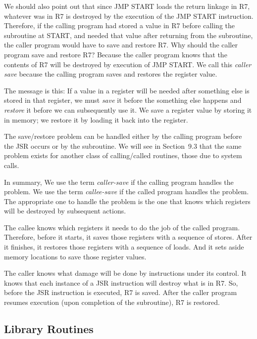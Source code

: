 \documentclass{patt}
\begin{document}
We should also point out that since JMP START loads the return linkage in R7,
whatever was in R7 is destroyed by the execution of the JMP START instruction. 
Therefore, if the calling program had stored a value in R7 before calling the
subroutine at START, and needed that value after returning from the subroutine,
the caller program would have to save and restore R7.  Why should the caller
program save and restore R7?  Because the caller program knows that the contents
of R7 will be destroyed by execution of JMP START.  We call this 
{\em caller save} because the calling program saves and restores the register
value.

The message is this: If a value in a register will be needed after
something else is stored in that register, we must {\em save} it
before the something else happens and {\em restore} it before we can
subsequently use it.  We save a register value by storing it in
memory; we restore it by loading it back into the register.  

The save/restore problem can be handled either by the calling
program before the JSR occurs or by the subroutine.  We will see
in Section~9.3 that the same problem exists for another class of
calling/called routines, those due to system calls.

In summary, We use the term {\em caller-save} if the calling program 
handles the problem. We use the term {\em callee-save} 
if the called program handles the  problem.  The
appropriate one to handle the problem is the one that knows which
registers will be destroyed by subsequent actions.

The callee knows which registers it needs to do the job of the called
program.  Therefore, before it starts, it saves those registers with a
sequence of stores.  After it finishes, it restores those registers
with a sequence of loads.  And it sets aside memory locations to save
those register values.  

The caller knows what damage will be done by instructions under its
control. It knows that each instance of a JSR instruction will destroy
what is in R7.  So, before the JSR instruction is executed, R7 is saved.  
After the caller program resumes execution (upon completion of the 
subroutine), R7 is restored.

\subsection{Library Routines}\label{library_routines}
\end{document}
